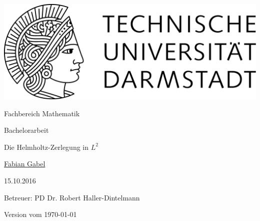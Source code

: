 \begin{titlepage}
  \begin{center}
    \vspace{1cm}
    \includegraphics[width=0.5\linewidth]{TU_Darmstadt_Logo.pdf}
    \vspace{1cm}
    
    \large{Fachbereich Mathematik}
    \vspace{2.5cm}
    
    \huge{Bachelorarbeit}
    \vspace{2cm}

    \Huge{Die Helmholtz-Zerlegung in $L^2$}
    
    \vspace*{3cm}    
    
		\large
                \href{mailto:gabel@mathematik.tu-darmstadt.de}{Fabian Gabel}
    \vspace*{1.0cm}

    15.10.2016 \\
    \vspace*{2cm}

    Betreuer: PD Dr. Robert Haller-Dintelmann

    \vspace*{.5cm}

    \vspace*{\fill}
    \tiny{Version vom \today}
  \end{center}
\end{titlepage}
